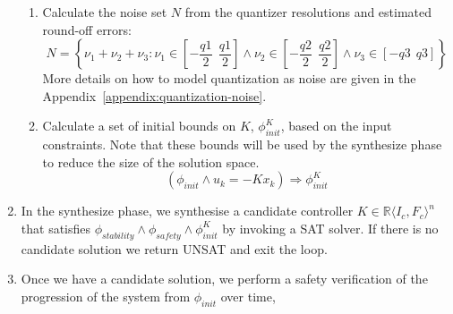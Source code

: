 \documentclass[runningheads,a4paper]{llncs}
\newcommand{\mat}[1]{\boldsymbol{#1}}
\begin{document}
\begin{enumerate}
\begin{enumerate}
\item Calculate the noise set $N$ from the quantizer resolutions and estimated round-off errors: %
$$N=\left \{ \nu_1+\nu_2+ \nu_3 : \nu_1 \in \left[-\frac{q1}{2}\ \ \frac{q1}{2}\right] 
\wedge \nu_2 \in \left[-\frac{q2}{2}\ \ \frac{q2}{2}\right]  \wedge \nu_3 \in \left[-q3\ \ q3\right]  \right \}\nonumber$$
More details on how to model quantization as noise are given in the 
Appendix~\ref{appendix:quantization-noise}.
\item Calculate a set of initial bounds on $K$, $\phi_{init}^{K}$, based on the input constraints. Note that these bounds will be used by the {\sc synthesize} phase to reduce the size of the solution space.
$$(\phi_{init} \wedge u_k=-K x_k) \Rightarrow \phi_{init}^{K}$$

\end{enumerate}
\item In the {\sc synthesize} phase, we synthesise a candidate controller
  $K \in \mathbb{R}\langle I_c,F_c\rangle^n$ that satisfies
  $\phi_{stability} \wedge \phi_{safety} \wedge \phi_{init}^{K}$ by invoking a SAT solver.
If there is no candidate solution we return UNSAT and exit the loop.
\item Once we have a candidate solution, we perform a safety verification %
  of the 
  progression of the system from $\phi_{init}$ over time,

\end{enumerate}
\end{document}
